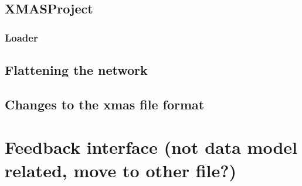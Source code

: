 \subsection{XMASProject}

\subsubsection{Loader}

\subsection{Flattening the network}

\subsection{Changes to the xmas file format}

\section{Feedback interface (not data model related, move to other file?)}

\newpage

